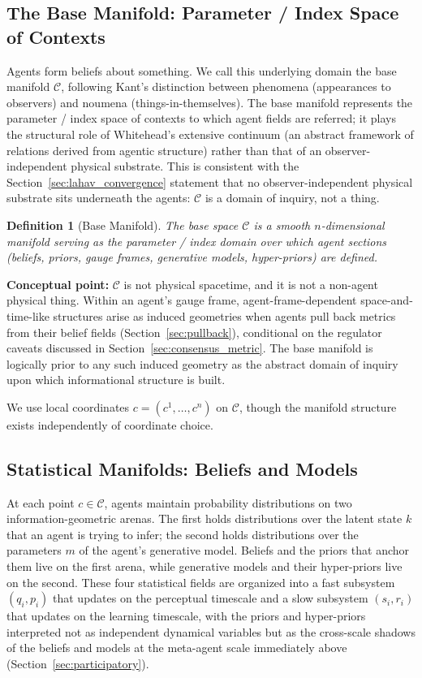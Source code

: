 \documentclass[11pt]{article}
\newtheorem{definition}{Definition}
\begin{document}
\subsection{The Base Manifold: Parameter / Index Space of Contexts}

Agents form beliefs about something. We call this underlying domain the base manifold $\mathcal{C}$, following Kant's distinction between phenomena (appearances to observers) and noumena (things-in-themselves). The base manifold represents the parameter / index space of contexts to which agent fields are referred; it plays the structural role of Whitehead's extensive continuum (an abstract framework of relations derived from agentic structure) rather than that of an observer-independent physical substrate. This is consistent with the Section~\ref{sec:lahav_convergence} statement that no observer-independent physical substrate sits underneath the agents: $\mathcal{C}$ is a domain of inquiry, not a thing.

\begin{definition}[Base Manifold]
\label{def:base_manifold}
The base space $\mathcal{C}$ is a smooth $n$-dimensional manifold serving as the parameter / index domain over which agent sections (beliefs, priors, gauge frames, generative models, hyper-priors) are defined.
\end{definition}

\textbf{Conceptual point:} $\mathcal{C}$ is not physical spacetime, and it is not a non-agent physical thing. Within an agent's gauge frame, agent-frame-dependent space-and-time-like structures arise as induced geometries when agents pull back metrics from their belief fields (Section~\ref{sec:pullback}), conditional on the regulator caveats discussed in Section~\ref{sec:consensus_metric}. The base manifold is logically prior to any such induced geometry as the abstract domain of inquiry upon which informational structure is built.

We use local coordinates $c = (c^1, \ldots, c^n)$ on $\mathcal{C}$, though the manifold structure exists independently of coordinate choice.

\subsection{Statistical Manifolds: Beliefs and Models}
\label{sec:statistical_manifolds}

At each point $c \in \mathcal{C}$, agents maintain probability distributions on two information-geometric arenas. The first holds distributions over the latent state $k$ that an agent is trying to infer; the second holds distributions over the parameters $m$ of the agent's generative model. Beliefs and the priors that anchor them live on the first arena, while generative models and their hyper-priors live on the second. These four statistical fields are organized into a fast subsystem $(q_i, p_i)$ that updates on the perceptual timescale and a slow subsystem $(s_i, r_i)$ that updates on the learning timescale, with the priors and hyper-priors interpreted not as independent dynamical variables but as the cross-scale shadows of the beliefs and models at the meta-agent scale immediately above (Section~\ref{sec:participatory}).
\end{document}
